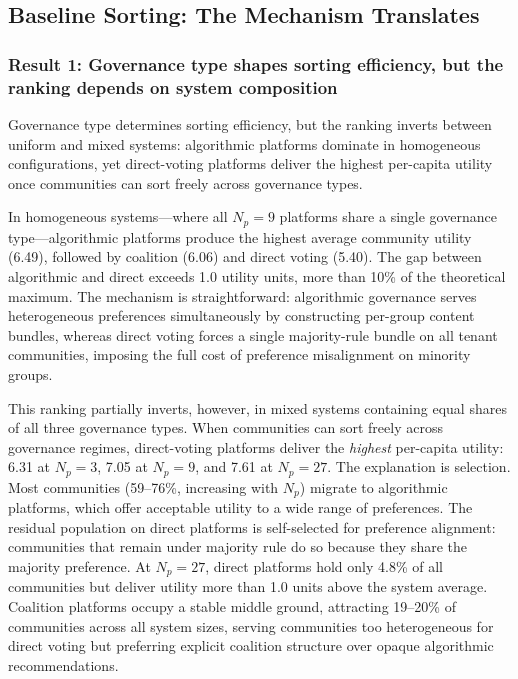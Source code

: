 \documentclass{article}
\begin{document}
\subsection{Baseline Sorting: The Mechanism Translates}
\label{sec:results_exp1}

\subsubsection{Result 1: Governance type shapes sorting efficiency, but the ranking depends on system composition}

Governance type determines sorting efficiency, but the ranking inverts between uniform and mixed systems: algorithmic platforms dominate in homogeneous configurations, yet direct-voting platforms deliver the highest per-capita utility once communities can sort freely across governance types.

In homogeneous systems---where all $N_p = 9$ platforms share a single governance type---algorithmic platforms produce the highest average community utility (6.49), followed by coalition (6.06) and direct voting (5.40). The gap between algorithmic and direct exceeds 1.0 utility units, more than 10\% of the theoretical maximum. The mechanism is straightforward: algorithmic governance serves heterogeneous preferences simultaneously by constructing per-group content bundles, whereas direct voting forces a single majority-rule bundle on all tenant communities, imposing the full cost of preference misalignment on minority groups.

This ranking partially inverts, however, in mixed systems containing equal shares of all three governance types. When communities can sort freely across governance regimes, direct-voting platforms deliver the \textit{highest} per-capita utility: 6.31 at $N_p = 3$, 7.05 at $N_p = 9$, and 7.61 at $N_p = 27$. The explanation is selection. Most communities (59--76\%, increasing with $N_p$) migrate to algorithmic platforms, which offer acceptable utility to a wide range of preferences. The residual population on direct platforms is self-selected for preference alignment: communities that remain under majority rule do so because they share the majority preference. At $N_p = 27$, direct platforms hold only 4.8\% of all communities but deliver utility more than 1.0 units above the system average. Coalition platforms occupy a stable middle ground, attracting 19--20\% of communities across all system sizes, serving communities too heterogeneous for direct voting but preferring explicit coalition structure over opaque algorithmic recommendations.
\end{document}
